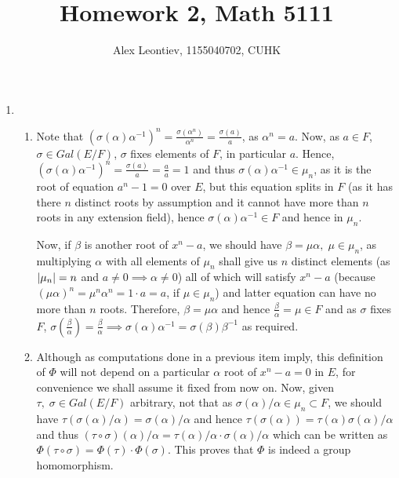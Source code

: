 \documentclass[8pt]{article} %
\title{Homework 2, Math 5111}
\author{Alex Leontiev, 1155040702, CUHK}
\begin{document}
\maketitle
\begin{enumerate}[label=\bfseries Problem \arabic*.]
	\item{
		\begin{enumerate}[label=(\arabic*).]
			\item{Note that $(\sigma(\alpha)\alpha^{-1})^n=\frac{\sigma(\alpha^n)}{\alpha^n}=\frac{\sigma(a)}{a}$, as $\alpha^n=a$. Now, as
				$a\in F$, $\sigma\in Gal(E/F)$, $\sigma$ fixes elements of $F$, in particular $a$. Hence,
				$(\sigma(\alpha)\alpha^{-1})^n=\frac{\sigma(a)}{a}=\frac{a}{a}=1$ and thus $\sigma(\alpha)\alpha^{-1}\in\mu_n$, as it is
				the root of equation $a^n-1=0$ over $E$, but this equation splits in $F$ (as it has there $n$ distinct roots by assumption and it
				cannot have more than $n$ roots in any extension field), hence $\sigma(\alpha)\alpha^{-1}\in F$ and hence in $\mu_n$.

				Now, if $\beta$ is another root of $x^n-a$, we should have $\beta=\mu\alpha,\;\mu\in\mu_n$, as multiplying $\alpha$ with all elements
				of $\mu_n$ shall give us $n$ distinct elements (as $\left|\mu_n\right|=n$ and $a\neq 0\implies\alpha\neq 0$) all of which will satisfy
				$x^n-a$ (because $(\mu\alpha)^n=\mu^n\alpha^n=1\cdot a=a$, if $\mu\in\mu_n$) and latter equation can have no more than $n$ roots.
				Therefore, $\beta=\mu\alpha$ and hence $\frac{\beta}{\alpha}=\mu\in F$ and as $\sigma$ fixes $F$, $\sigma\left(\frac{\beta}{\alpha}
				\right)=\frac{\beta}{\alpha}\implies \sigma(\alpha)\alpha^{-1}=\sigma(\beta)\beta^{-1}$ as required.
				}
			\item{Although as computations done in a previous item imply, this definition of $\Phi$ will not depend on a particular $\alpha$ root
				of $x^n-a=0$ in $E$, for convenience we shall assume it fixed from now on. Now, given $\tau,\;\sigma\in Gal(E/F)$ arbitrary,
				not that as $\sigma(\alpha)/\alpha\in\mu_n\subset F$, we should have $\tau(\sigma(\alpha)/\alpha)=\sigma(\alpha)/\alpha$ and hence
				$\tau(\sigma(\alpha))=\tau(\alpha)\sigma(\alpha)/\alpha$ and thus $(\tau\circ\sigma)(\alpha)/\alpha=\tau(\alpha)/\alpha\cdot
				\sigma(\alpha)/\alpha$ which can be written as $\Phi(\tau\circ\sigma)=\Phi(\tau)\cdot\Phi(\sigma)$. This proves that $\Phi$ is indeed
				a group homomorphism.

}
\end{enumerate}}
\end{enumerate}
\end{document}
